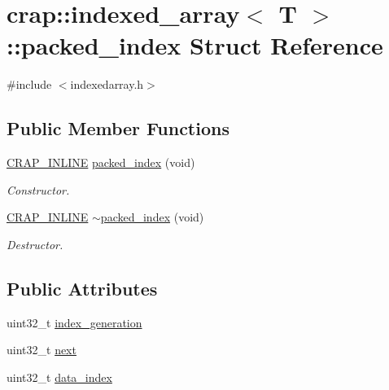 \hypertarget{structcrap_1_1indexed__array_1_1packed__index}{\section{crap\+:\+:indexed\+\_\+array$<$ T $>$\+:\+:packed\+\_\+index Struct Reference}
\label{structcrap_1_1indexed__array_1_1packed__index}
}


{\ttfamily \#include $<$indexedarray.\+h$>$}

\subsection*{Public Member Functions}
\begin{DoxyCompactItemize}
\item 
\hyperlink{config__x86_8h_a5a40526b8d842e7ff731509998bb0f1c}{C\+R\+A\+P\+\_\+\+I\+N\+L\+I\+N\+E} \hyperlink{structcrap_1_1indexed__array_1_1packed__index_aad0faf66ec3327d5bf42f67928f66fcd}{packed\+\_\+index} (void)
\begin{DoxyCompactList}\small\item\em Constructor. \end{DoxyCompactList}\item 
\hyperlink{config__x86_8h_a5a40526b8d842e7ff731509998bb0f1c}{C\+R\+A\+P\+\_\+\+I\+N\+L\+I\+N\+E} \hyperlink{structcrap_1_1indexed__array_1_1packed__index_af40be03923d226ed3f78a57dbc2cb831}{$\sim$packed\+\_\+index} (void)
\begin{DoxyCompactList}\small\item\em Destructor. \end{DoxyCompactList}\end{DoxyCompactItemize}
\subsection*{Public Attributes}
\begin{DoxyCompactItemize}
\item 
uint32\+\_\+t \hyperlink{structcrap_1_1indexed__array_1_1packed__index_af5423207ebc6a3cbf46e5689d840e2af}{index\+\_\+generation}
\item 
uint32\+\_\+t \hyperlink{structcrap_1_1indexed__array_1_1packed__index_a790171618ecc2fe9aa6b1b7526c43201}{next}
\item 
uint32\+\_\+t \hyperlink{structcrap_1_1indexed__array_1_1packed__index_a743ddc52af6d873167476bbca9fc23a8}{data\+\_\+index}
\end{DoxyCompactItemize}


